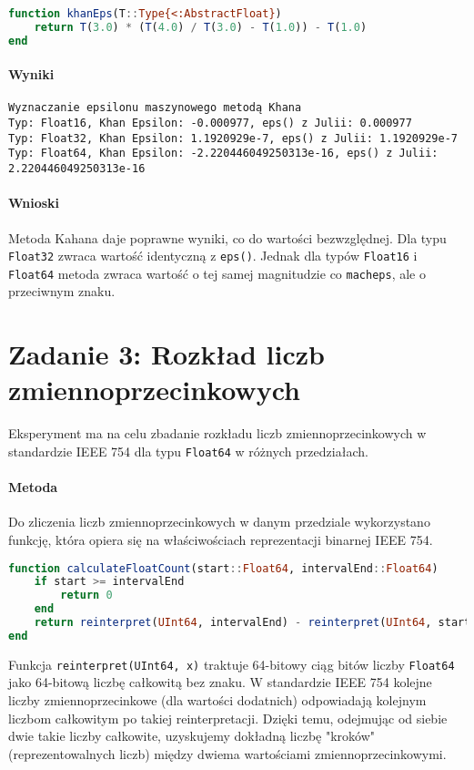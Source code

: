 \documentclass[a4paper,12pt]{article}
\begin{document}
\begin{lstlisting}[language=Julia]
function khanEps(T::Type{<:AbstractFloat})
    return T(3.0) * (T(4.0) / T(3.0) - T(1.0)) - T(1.0)
end
\end{lstlisting}

\paragraph{Wyniki}
\begin{verbatim}
Wyznaczanie epsilonu maszynowego metodą Khana
Typ: Float16, Khan Epsilon: -0.000977, eps() z Julii: 0.000977
Typ: Float32, Khan Epsilon: 1.1920929e-7, eps() z Julii: 1.1920929e-7
Typ: Float64, Khan Epsilon: -2.220446049250313e-16, eps() z Julii: 2.220446049250313e-16
\end{verbatim}

\paragraph{Wnioski}
Metoda Kahana daje poprawne wyniki, co do wartości bezwzględnej. Dla typu \texttt{Float32} zwraca wartość identyczną z \texttt{eps()}. Jednak dla typów \texttt{Float16} i \texttt{Float64} metoda zwraca wartość o tej samej magnitudzie co \texttt{macheps}, ale o przeciwnym znaku.

\section{Zadanie 3: Rozkład liczb zmiennoprzecinkowych}

Eksperyment ma na celu zbadanie rozkładu liczb zmiennoprzecinkowych w standardzie IEEE 754 dla typu \texttt{Float64} w różnych przedziałach.

\paragraph{Metoda}
Do zliczenia liczb zmiennoprzecinkowych w danym przedziale wykorzystano funkcję, która opiera się na właściwościach reprezentacji binarnej IEEE 754.

\begin{lstlisting}[language=Julia]
function calculateFloatCount(start::Float64, intervalEnd::Float64)
    if start >= intervalEnd
        return 0
    end
    return reinterpret(UInt64, intervalEnd) - reinterpret(UInt64, start)
end
\end{lstlisting}

Funkcja \texttt{reinterpret(UInt64, x)} traktuje 64-bitowy ciąg bitów liczby \texttt{Float64} jako 64-bitową liczbę całkowitą bez znaku. W standardzie IEEE 754 kolejne liczby zmiennoprzecinkowe (dla wartości dodatnich) odpowiadają kolejnym liczbom całkowitym po takiej reinterpretacji. Dzięki temu, odejmując od siebie dwie takie liczby całkowite, uzyskujemy dokładną liczbę "kroków" (reprezentowalnych liczb) między dwiema wartościami zmiennoprzecinkowymi.
\end{document}
